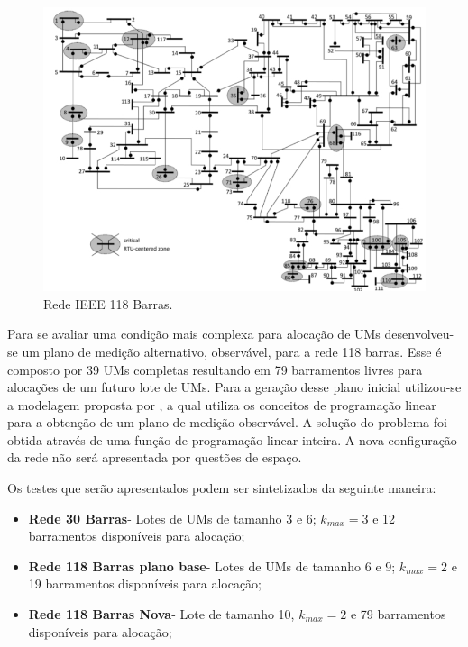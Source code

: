 \documentclass[12pt]{article}
\begin{document}
\begin{figure}[H]
	\centering 
	\includegraphics[scale=0.8]{figuras/Rede118bus.jpg}
	\caption{Rede IEEE 118 Barras.\cite{Quant13}}
	\label{fig13} %
\end{figure}

Para se avaliar uma condição mais complexa para alocação de UMs desenvolveu-se um plano de medição alternativo, observável, para a rede 118 barras. Esse é composto por 39 UMs completas resultando em 79 barramentos livres para alocações de um futuro lote de UMs. Para a geração desse plano inicial utilizou-se a modelagem proposta por \cite{Gou08_1}, a qual utiliza os conceitos de programação linear para a obtenção de um plano de medição observável. A solução do problema foi obtida através de uma função de programação linear inteira. A nova configuração da rede não será apresentada por questões de espaço.

Os testes que serão apresentados podem ser sintetizados da seguinte maneira:

\begin{itemize}
	\item \textbf{Rede 30 Barras}- Lotes de UMs de tamanho 3 e 6; $k_{max}=3$ e 12 barramentos disponíveis para alocação;

	\item \textbf{Rede 118 Barras plano base}- Lotes de UMs de tamanho 6 e 9; $k_{max}=2$ e 19 barramentos disponíveis para alocação;

	\item \textbf{Rede 118 Barras Nova}- Lote de tamanho 10, $k_{max}=2$ e 79 barramentos disponíveis para alocação;
\end{itemize}
\end{document}
